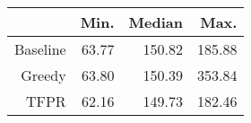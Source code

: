 \begin{table}[ht]
\centering
\begin{tabular}{rrrr}
  \hline
 & Min. & Median & Max. \\ 
  \hline
Baseline & 63.77 & 150.82 & 185.88 \\ 
  Greedy & 63.80 & 150.39 & 353.84 \\ 
  TFPR & 62.16 & 149.73 & 182.46 \\ 
   \hline
\end{tabular}
\end{table}
